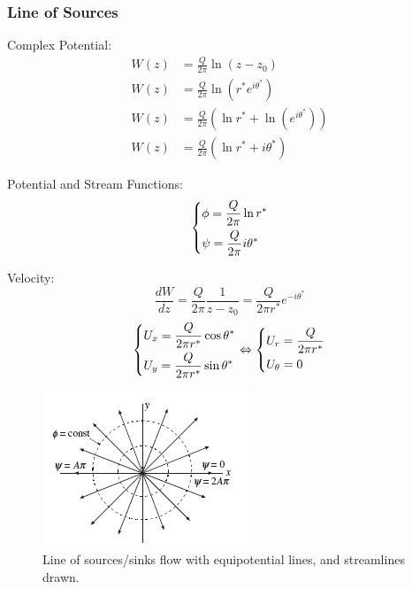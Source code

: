 \subsubsection{Line of Sources}
Complex Potential:
\begin{align}
    W(z) &= \frac{Q}{2\pi}\ln(z-z_0) \\
    W(z) &= \frac{Q}{2\pi}\ln(r^*e^{i\theta^*}) \\
    W(z) &= \frac{Q}{2\pi}\left( \ln r^* + \ln(e^{i\theta^*}) \right) \\
    W(z) &= \frac{Q}{2\pi}\left( \ln r^* + i\theta^* \right)
\end{align}

Potential and Stream Functions:
\begin{equation}
    \begin{dcases}
        \phi = \frac{Q}{2\pi} \ln r^* \\
        \psi = \frac{Q}{2\pi} i\theta^*
    \end{dcases}
\end{equation}

Velocity:
\begin{equation}
    \frac{dW}{dz} =  \frac{Q}{2\pi} \frac{1}{z-z_0} = \frac{Q}{2\pi r^*} e^{-i\theta^*}
\end{equation}
\begin{equation}
    \begin{dcases}
        U_x = \frac{Q}{2\pi r^*}  \cos\theta^*\\
        U_y =  \frac{Q}{2\pi r^*}  \sin\theta^*
    \end{dcases}
    \Leftrightarrow
    \begin{dcases}
        U_r = \frac{Q}{2\pi r^*} \\
        U_{\theta} = 0
    \end{dcases}
\end{equation}

\begin{figure}[!h]
    \centering
    \includegraphics[scale=1.0]{./img/sourcesink_flow.png}
    \caption{Line of sources/sinks flow with equipotential lines, and streamlines drawn.}
    \label{joukowski_cylinder}
\end{figure}





